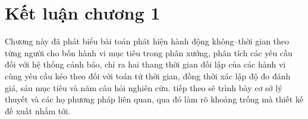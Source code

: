 \section*{Kết luận chương 1}

Chương này đã phát biểu bài toán phát hiện hành động không--thời gian theo từng người cho bốn hành vi mục tiêu trong phân xưởng, phân tích các yêu cầu đối với hệ thống cảnh báo, chỉ ra hai thang thời gian đối lập của các hành vi cùng yêu cầu kéo theo đối với toán tử thời gian, đồng thời xác lập độ đo đánh giá, sáu mục tiêu và năm câu hỏi nghiên cứu.  tiếp theo sẽ trình bày cơ sở lý thuyết và các họ phương pháp liên quan, qua đó làm rõ khoảng trống mà thiết kế đề xuất nhắm tới.
